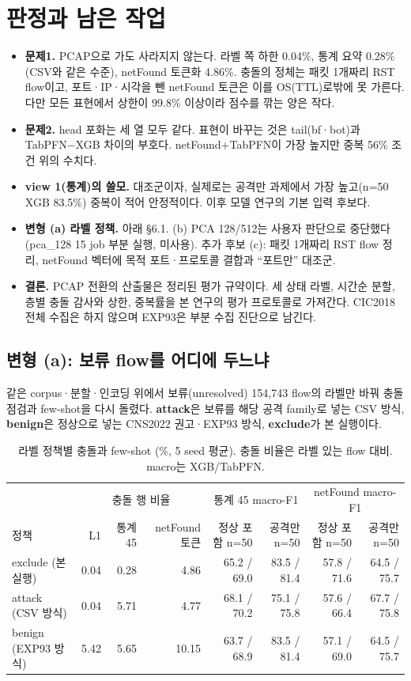 \section{판정과 남은 작업}
\begin{itemize}
\item \textbf{문제1.} PCAP으로 가도 사라지지 않는다. 라벨 쪽 하한 0.04\%, 통계 요약 0.28\%(CSV와 같은 수준), netFound 토큰화 4.86\%. 충돌의 정체는 패킷 1개짜리 RST flow이고, 포트·IP·시각을 뺀 netFound 토큰은 이를 OS(TTL)로밖에 못 가른다. 다만 모든 표현에서 상한이 99.8\% 이상이라 점수를 깎는 양은 작다.
\item \textbf{문제2.} head 포화는 세 열 모두 같다. 표현이 바꾸는 것은 tail(bf·bot)과 TabPFN$-$XGB 차이의 부호다. netFound+TabPFN이 가장 높지만 중복 56\% 조건 위의 수치다.
\item \textbf{view 1(통계)의 쓸모.} 대조군이자, 실제로는 공격만 과제에서 가장 높고(n=50 XGB 83.5\%) 중복이 적어 안정적이다. 이후 모델 연구의 기본 입력 후보다.
\item \textbf{변형 (a) 라벨 정책.} 아래 \S6.1. (b) PCA 128/512는 사용자 판단으로 중단했다(pca\_128 15 job 부분 실행, 미사용). 추가 후보 (c): 패킷 1개짜리 RST flow 정리, netFound 벡터에 목적 포트·프로토콜 결합과 ``포트만'' 대조군.
\item \textbf{결론.} PCAP 전환의 산출물은 정리된 평가 규약이다. 세 상태 라벨, 시간순 분할, 층별 충돌 감사와 상한, 중복률을 본 연구의 평가 프로토콜로 가져간다. CIC2018 전체 수집은 하지 않으며 EXP93은 부분 수집 진단으로 남긴다.
\end{itemize}

\subsection{변형 (a): 보류 flow를 어디에 두느냐}
같은 corpus·분할·인코딩 위에서 보류(unresolved) 154,743 flow의 라벨만 바꿔 충돌 점검과 few-shot을 다시 돌렸다. \textbf{attack}은 보류를 해당 공격 family로 넣는 CSV 방식, \textbf{benign}은 정상으로 넣는 CNS2022 권고·EXP93 방식, \textbf{exclude}가 본 실행이다.

\begin{table}[H]
\centering\small
\caption{라벨 정책별 충돌과 few-shot (\%, 5 seed 평균). 충돌 비율은 라벨 있는 flow 대비. macro는 XGB/TabPFN.}
\footnotesize
\begin{tabular}{lrrr|rr|rr}
\toprule & \multicolumn{3}{c|}{충돌 행 비율} & \multicolumn{2}{c|}{통계 45 macro-F1} & \multicolumn{2}{c}{netFound macro-F1}\\
정책 & L1 & 통계 45 & netFound 토큰 & 정상 포함 n=50 & 공격만 n=50 & 정상 포함 n=50 & 공격만 n=50\\\midrule
exclude (본 실행) & 0.04 & 0.28 & 4.86 & 65.2 / 69.0 & 83.5 / 81.4 & 57.8 / 71.6 & 64.5 / 75.7\\
attack (CSV 방식) & 0.04 & 5.71 & 4.77 & 68.1 / 70.2 & 75.1 / 75.8 & 57.6 / 66.4 & 67.7 / 75.8\\
benign (EXP93 방식) & 5.42 & 5.65 & 10.15 & 63.7 / 68.9 & 83.5 / 81.4 & 57.1 / 69.0 & 64.5 / 75.7\\
\bottomrule
\end{tabular}
\end{table}

